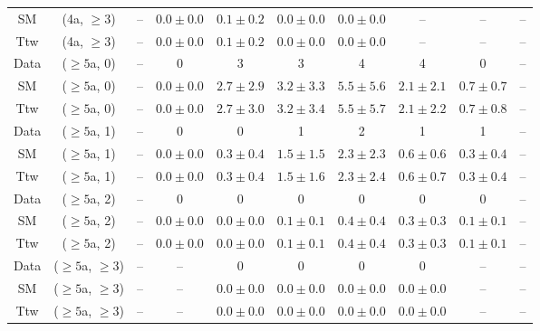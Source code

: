 \begin{table}[h!]
{\begin{tabular}{cccccccccc}
	SM & (4a, $\ge3$) & -- & $0.0\pm 0.0$ & $0.1\pm 0.2$ & $0.0\pm 0.0$ & $0.0\pm 0.0$ & -- & -- & -- \\[0.5ex] 
	Ttw & (4a, $\ge3$) & -- & $0.0\pm 0.0$ & $0.1\pm 0.2$ & $0.0\pm 0.0$ & $0.0\pm 0.0$ & -- & -- & -- \\[0.5ex] 
	Data & ($\ge5$a, 0) & -- & 0 & 3 & 3 & 4 & 4 & 0 & -- \\[0.5ex] 
	SM & ($\ge5$a, 0) & -- & $0.0\pm 0.0$ & $2.7\pm 2.9$ & $3.2\pm 3.3$ & $5.5\pm 5.6$ & $2.1\pm 2.1$ & $0.7\pm 0.7$ & -- \\[0.5ex] 
	Ttw & ($\ge5$a, 0) & -- & $0.0\pm 0.0$ & $2.7\pm 3.0$ & $3.2\pm 3.4$ & $5.5\pm 5.7$ & $2.1\pm 2.2$ & $0.7\pm 0.8$ & -- \\[0.5ex] 
	Data & ($\ge5$a, 1) & -- & 0 & 0 & 1 & 2 & 1 & 1 & -- \\[0.5ex] 
	SM & ($\ge5$a, 1) & -- & $0.0\pm 0.0$ & $0.3\pm 0.4$ & $1.5\pm 1.5$ & $2.3\pm 2.3$ & $0.6\pm 0.6$ & $0.3\pm 0.4$ & -- \\[0.5ex] 
	Ttw & ($\ge5$a, 1) & -- & $0.0\pm 0.0$ & $0.3\pm 0.4$ & $1.5\pm 1.6$ & $2.3\pm 2.4$ & $0.6\pm 0.7$ & $0.3\pm 0.4$ & -- \\[0.5ex] 
	Data & ($\ge5$a, 2) & -- & 0 & 0 & 0 & 0 & 0 & 0 & -- \\[0.5ex] 
	SM & ($\ge5$a, 2) & -- & $0.0\pm 0.0$ & $0.0\pm 0.0$ & $0.1\pm 0.1$ & $0.4\pm 0.4$ & $0.3\pm 0.3$ & $0.1\pm 0.1$ & -- \\[0.5ex] 
	Ttw & ($\ge5$a, 2) & -- & $0.0\pm 0.0$ & $0.0\pm 0.0$ & $0.1\pm 0.1$ & $0.4\pm 0.4$ & $0.3\pm 0.3$ & $0.1\pm 0.1$ & -- \\[0.5ex] 
	Data & ($\ge5$a, $\ge3$) & -- & -- & 0 & 0 & 0 & 0 & -- & -- \\[0.5ex] 
	SM & ($\ge5$a, $\ge3$) & -- & -- & $0.0\pm 0.0$ & $0.0\pm 0.0$ & $0.0\pm 0.0$ & $0.0\pm 0.0$ & -- & -- \\[0.5ex] 
	Ttw & ($\ge5$a, $\ge3$) & -- & -- & $0.0\pm 0.0$ & $0.0\pm 0.0$ & $0.0\pm 0.0$ & $0.0\pm 0.0$ & -- & -- \\[0.5ex] 
	\hline
	\hline
\end{tabular}}
\end{table}
